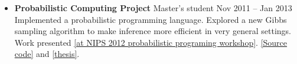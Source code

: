 \documentclass[11 pt]{article}
\begin{document}
\begin{itemize}
\item \textbf{Probabilistic Computing Project} Master's student \hfill Nov 2011 -- Jan 2013 \\
Implemented a probabilistic programming language.
Explored a new Gibbs sampling algorithm to make inference more efficient in very general settings.
Work presented \href{http://probabilistic-programming.org/wiki/NIPS*2012_Workshop/Schedule#poster-wu}{[at NIPS 2012 probabilistic programing workshop]}.
\href{https://github.com/WuTheFWasThat/PyChurch.}{[Source code]}
and
\href{https://github.com/WuTheFWasThat/PyChurch/blob/master/papers/MEng\%20thesis.pdf}{[thesis]}.









\end{itemize}
\end{document}
